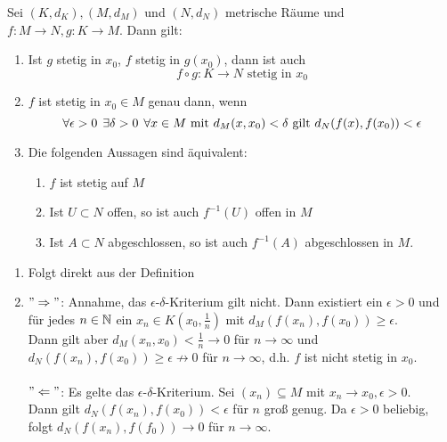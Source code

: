 \begin{prop} \label{prop:4.13}
	Sei $(K,d_{K}), (M, d_{M})$ und $(N, d_{N})$ metrische Räume und $f \colon M \rightarrow N, g \colon K \rightarrow M$. Dann gilt:
	\begin{enumerate}[label=\alph*\upshape)]
		\item Ist $g$ stetig in $x_{0}$, $f$ stetig in $g(x_{0})$, dann ist auch 
			\[ f \circ g \colon K \rightarrow N \text{ stetig in } x_{0} \]
		\item \label{prop:4.13.b} $f$ ist stetig in $x_{0} \in M$ genau dann, wenn 
			\[ \forall \epsilon > 0 \hspace{0.15cm} \exists \delta > 0 \hspace{0.15cm} \forall x \in M \text{ mit } d_{M}(x, x_{0}) < \delta \text{ gilt } d_{N}(f(x), f(x_{0})) < \epsilon \]
		\item Die folgenden Aussagen sind äquivalent:
			\begin{enumerate}[label=(\roman*\upshape)]
				\item $f$ ist stetig auf $M$
				\item Ist $U \subset N$ offen, so ist auch $f^{-1}(U)$ offen in $M$
				\item Ist $A \subset N$ abgeschlossen, so ist auch $f^{-1}(A)$ abgeschlossen in $M$.
			\end{enumerate}
	\end{enumerate}	
	\begin{beweis}		
		\begin{enumerate}[label=\alph*\upshape)]	
			\item Folgt direkt aus der Definition
			\item $" \Rightarrow "$: Annahme, das $\epsilon$-$\delta$-Kriterium gilt nicht. Dann existiert ein $\epsilon > 0$ und für jedes $n \in \mathbb{N}$ ein $x_{n} \in K(x_{0}, \frac{1}{n})$ mit $d_{M}(f(x_{n}), f(x_{0})) \geq \epsilon$. \\
				Dann gilt aber $d_{M}(x_{n}, x_{0}) < \frac{1}{n} \rightarrow 0$ für $n \rightarrow \infty$ und $d_{N}(f(x_{n}), f(x_{0})) \geq \epsilon \not\rightarrow 0$ für $n \rightarrow \infty$, d.h. $f$ ist nicht stetig in $x_{0}$. \\ \\
				$" \Leftarrow "$: Es gelte das $\epsilon$-$\delta$-Kriterium. Sei $(x_{n}) \subseteq M$ mit $x_{n} \rightarrow x_{0}, \epsilon > 0$. \\
				Dann gilt $d_{N}(f(x_{n}), f(x_{0})) < \epsilon$ für $n$ gro{\ss} genug. Da $\epsilon > 0$ beliebig, folgt $d_{N}(f(x_{n}), f(f_{0})) \rightarrow 0$ für $n \rightarrow \infty$.

\end{enumerate}
\end{beweis}
\end{prop}
